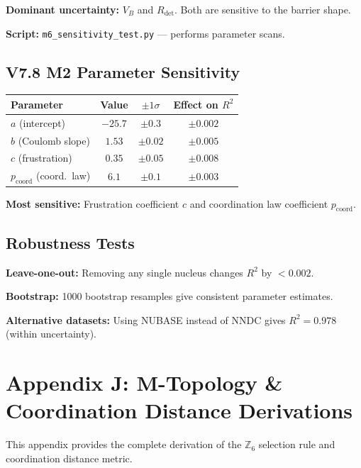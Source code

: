 \documentclass[11pt,a4paper]{article}
\begin{document}
\textbf{Dominant uncertainty:} $V_B$ and $R_{\text{det}}$. Both are sensitive to the barrier shape.

\textbf{Script:} \texttt{m6\_sensitivity\_test.py} --- performs parameter scans.

\subsection{V7.8 M2 Parameter Sensitivity}

\begin{center}
\begin{tabular}{lccc}
\toprule
\textbf{Parameter} & \textbf{Value} & \textbf{$\pm 1\sigma$} & \textbf{Effect on $R^2$} \\
\midrule
$a$ (intercept) & $-25.7$ & $\pm 0.3$ & $\pm 0.002$ \\
$b$ (Coulomb slope) & $1.53$ & $\pm 0.02$ & $\pm 0.005$ \\
$c$ (frustration) & $0.35$ & $\pm 0.05$ & $\pm 0.008$ \\
$p_{\mathrm{coord}}$ (coord.\ law) & $6.1$ & $\pm 0.1$ & $\pm 0.003$ \\
\bottomrule
\end{tabular}
\end{center}

\textbf{Most sensitive:} Frustration coefficient $c$ and coordination law coefficient $p_{\mathrm{coord}}$.

\subsection{Robustness Tests}

\textbf{Leave-one-out:} Removing any single nucleus changes $R^2$ by $< 0.002$.

\textbf{Bootstrap:} 1000 bootstrap resamples give consistent parameter estimates.

\textbf{Alternative datasets:} Using NUBASE instead of NNDC gives $R^2 = 0.978$ (within uncertainty).

\section{Appendix J: M-Topology \& Coordination Distance Derivations}
\label{app:mtopology}

This appendix provides the complete derivation of the $\mathbb{Z}_6$ selection rule and coordination distance metric.
\end{document}
